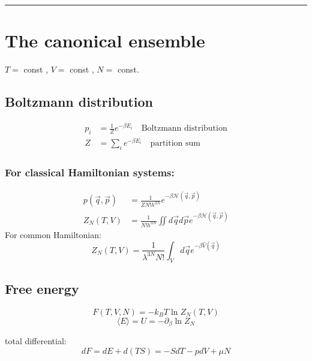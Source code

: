 \noindent\rule[1ex]{\textwidth/5}{1pt}
\section{The canonical ensemble}
$T=$ const , $V=$ const , $N=$ const.


\subsection*{Boltzmann distribution}

\begin{equation*}
    \begin{aligned}
        p_i &= \frac{1}{Z} e^{- \beta E_i} \quad \text{Boltzmann distribution} \\
        Z &= \sum_i e^{- \beta E_i} \quad \text{partition sum}
    \end{aligned}
\end{equation*}

\subsubsection*{For classical Hamiltonian systems:}
\begin{equation*}
    \begin{aligned}
        p(\vec{q}, \vec{p}) &= \frac{1}{Z N! h^{3N}} e^{- \beta \mathcal{H}(\vec{q},\vec{p})} \\
        Z_N (T,V) &= \frac{1}{N! h^{3N}} \iint d\vec{q} d\vec{p} e^{- \beta \mathcal{H}(\vec{q},\vec{p})}
    \end{aligned}
\end{equation*}
For common Hamiltonian:
\begin{equation*}
    Z_N (T,V) = \frac{1}{\lambda^{3N}N!} \int_V d\vec{q} e^{-\beta \hat{V}(\vec{q})}
\end{equation*}

\subsection*{Free energy}
\begin{equation*}
    F(T,V,N) = -k_B T \ln Z_N (T,V)
\end{equation*}
\begin{equation*}
    \langle E \rangle = U = - \partial_\beta \ln Z_N 
\end{equation*}

total differential:
\begin{equation*}
    dF = dE +d(TS) = -SdT - pdV + \mu N
\end{equation*}

